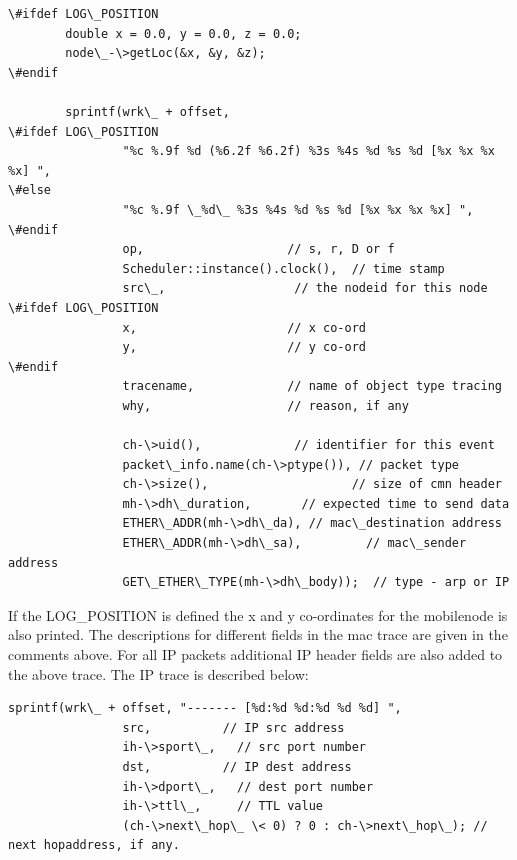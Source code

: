 \begin{verbatim}
\#ifdef LOG\_POSITION
        double x = 0.0, y = 0.0, z = 0.0;
        node\_-\>getLoc(&x, &y, &z);
\#endif

        sprintf(wrk\_ + offset,
\#ifdef LOG\_POSITION
                "%c %.9f %d (%6.2f %6.2f) %3s %4s %d %s %d [%x %x %x %x] ",
\#else
                "%c %.9f \_%d\_ %3s %4s %d %s %d [%x %x %x %x] ",
\#endif
                op,                    // s, r, D or f
                Scheduler::instance().clock(),  // time stamp
                src\_,                  // the nodeid for this node
\#ifdef LOG\_POSITION
                x,                     // x co-ord 
                y,                     // y co-ord
\#endif
                tracename,             // name of object type tracing
                why,                   // reason, if any

                ch-\>uid(),             // identifier for this event
                packet\_info.name(ch-\>ptype()), // packet type
                ch-\>size(),                    // size of cmn header
                mh-\>dh\_duration,       // expected time to send data 
                ETHER\_ADDR(mh-\>dh\_da), // mac\_destination address
                ETHER\_ADDR(mh-\>dh\_sa),         // mac\_sender address
                GET\_ETHER\_TYPE(mh-\>dh\_body));  // type - arp or IP
\end{verbatim}

If the LOG\_POSITION is defined the x and y co-ordinates for the
mobilenode is also printed. The descriptions for different fields in the
mac trace are given in the comments above. For all IP packets additional
IP header fields are also added to the above trace. The IP trace is
described below:

\begin{verbatim}
sprintf(wrk\_ + offset, "------- [%d:%d %d:%d %d %d] ",
                src,          // IP src address
                ih-\>sport\_,   // src port number
                dst,          // IP dest address
                ih-\>dport\_,   // dest port number
                ih-\>ttl\_,     // TTL value 
                (ch-\>next\_hop\_ \< 0) ? 0 : ch-\>next\_hop\_); // next hopaddress, if any.
\end{verbatim}

